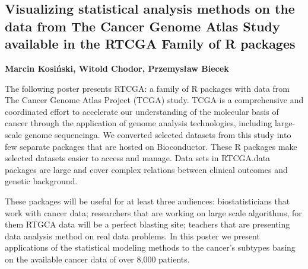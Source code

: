 \documentclass[\main/boa.tex]{subfiles}
\begin{document}
\subsection{Visualizing statistical analysis methods on the data from The Cancer Genome Atlas Study available in the RTCGA Family of R packages}

\begin{minipage}{0.915\textwidth}
\centering
{\bf {}  Marcin Kosiński,   Witold Chodor,   Przemysław Biecek}
\end{minipage}


\vskip 0.3cm

The following poster presents RTCGA: a family of R packages with data from The Cancer Genome Atlas Project (TCGA) study. TCGA is a comprehensive and coordinated effort to accelerate our understanding of the
molecular basis of cancer through the application of genome analysis technologies, including large-scale genome sequencinga. 
We converted selected datasets from this study into few separate packages that are hosted on Bioconductor.
These R packages make selected datasets easier to access and manage. Data sets in RTCGA.data packages are large and cover complex
relations between clinical outcomes and genetic background.

These packages will be useful for at least three audiences: biostatisticians that work with cancer data; researchers that are working on large scale algorithms, for them RTGCA data will be a perfect blasting site; teachers that are presenting data analysis method on real data problems. In this poster we present applications of the statistical modeling methods to the cancer’s subtypes basing on the available cancer data of over 8,000 patients.
\end{document}
